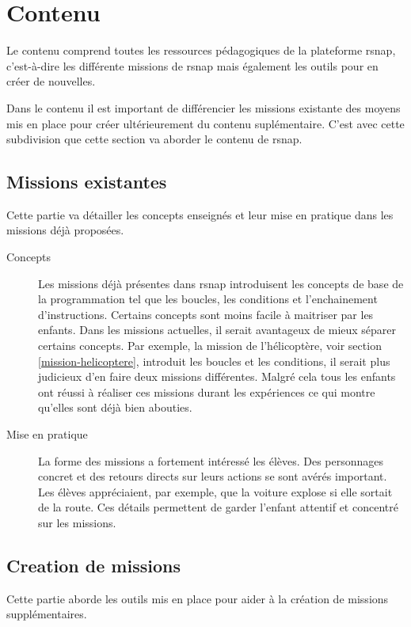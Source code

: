 \section{Contenu}
Le contenu comprend toutes les ressources pédagogiques de la plateforme \gls{rsnap}, c'est-à-dire les différente \glspl{mission} de \gls{rsnap} mais également les outils pour en créer de nouvelles.

Dans le contenu il est important de différencier les \glspl{mission} existante des moyens mis en place pour créer ultérieurement du contenu suplémentaire. C'est avec cette subdivision que cette section va aborder le contenu de \gls{rsnap}.

\subsection{Missions existantes}
Cette partie va détailler les concepts enseignés et leur mise en pratique dans les \glspl{mission} déjà proposées.
\begin{description}
  \item[Concepts] Les \glspl{mission} déjà présentes dans \gls{rsnap} introduisent les concepts de base de la programmation tel que les boucles, les conditions et l'enchainement d'instructions. Certains concepts sont moins facile à maitriser par les enfants. Dans les \glspl{mission} actuelles, il serait avantageux de mieux séparer certains concepts. Par exemple, la \gls{mission} de l'hélicoptère, voir section \ref{mission-helicoptere}, introduit les boucles et les conditions, il serait plus judicieux d'en faire deux \glspl{mission} différentes. Malgré cela tous les enfants ont réussi à réaliser ces \glspl{mission} durant les expériences ce qui montre qu'elles sont déjà bien abouties.

  \item[Mise en pratique] La forme des \glspl{mission} a fortement intéressé les élèves. Des personnages concret et des retours directs sur leurs actions se sont avérés important. Les élèves appréciaient, par exemple, que la voiture explose si elle sortait de la route. Ces détails permettent de garder l'enfant attentif et concentré sur les \glspl{mission}.
\end{description}

\subsection{Creation de missions}
Cette partie aborde les outils mis en place pour aider à la création de \glspl{mission} supplémentaires.

